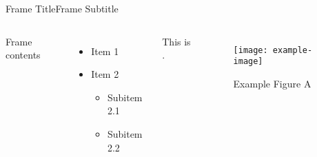 \begin{frame}{Frame Title}{Frame Subtitle}
    \begin{columns}
        Frame contents
            \begin{itemize}
                \item Item 1
                \item Item 2
                \begin{itemize}
                    \item Subitem 2.1 
                    \item Subitem 2.2 
                \end{itemize}
            \end{itemize}
            This is .
        \begin{figure}
            \begin{center}
                \texttt{[image: example-image]}
                \caption{Example Figure A}
            \end{center}
        \end{figure}
    \end{columns}
\end{frame}
